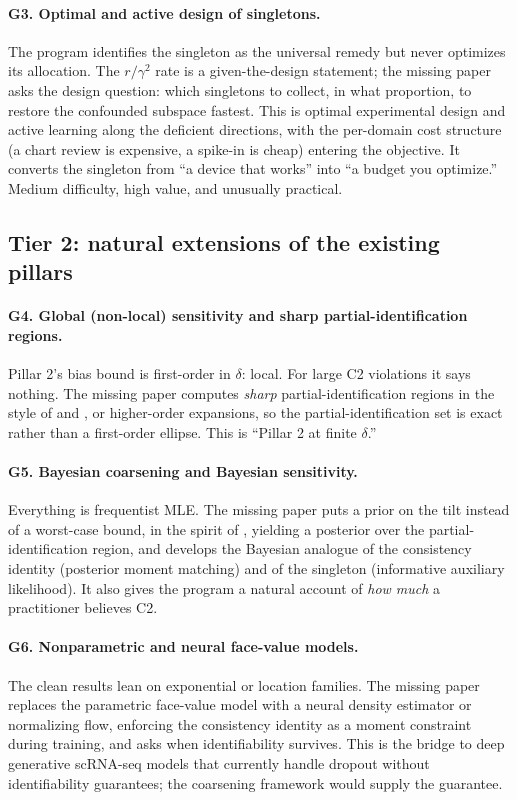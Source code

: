 \documentclass[11pt]{article}
\begin{document}
\paragraph{G3. Optimal and active design of singletons.}
The program identifies the singleton as the universal remedy but never optimizes its
allocation. The $r/\gamma^2$ rate is a given-the-design statement; the missing paper
asks the design question: which singletons to collect, in what proportion, to
restore the confounded subspace fastest. This is optimal experimental design and
active learning along the deficient directions, with the per-domain cost structure
(a chart review is expensive, a spike-in is cheap) entering the objective. It
converts the singleton from ``a device that works'' into ``a budget you optimize.''
Medium difficulty, high value, and unusually practical.

\subsection{Tier 2: natural extensions of the existing pillars}

\paragraph{G4. Global (non-local) sensitivity and sharp partial-identification regions.}
Pillar 2's bias bound is first-order in $\delta$: local. For large C2 violations it
says nothing. The missing paper computes \emph{sharp} partial-identification regions
in the style of \citet{manski1989anatomy} and \citet{tamer2010partial}, or
higher-order expansions, so the partial-identification
set is exact rather than a first-order ellipse. This is ``Pillar 2 at finite
$\delta$.''

\paragraph{G5. Bayesian coarsening and Bayesian sensitivity.}
Everything is frequentist MLE. The missing paper puts a prior on the tilt instead of
a worst-case bound, in the spirit of \citet{daniels2008missing}, yielding a posterior over the
partial-identification region, and develops the Bayesian analogue of the consistency
identity (posterior moment matching) and of the singleton (informative auxiliary
likelihood). It also gives the program a natural account of \emph{how much} a
practitioner believes C2.

\paragraph{G6. Nonparametric and neural face-value models.}
The clean results lean on exponential or location families. The missing paper
replaces the parametric face-value model with a neural density estimator or
normalizing flow, enforcing the consistency identity as a moment constraint during
training, and asks when identifiability survives. This is the bridge to deep
generative scRNA-seq models \citep[scVI, DCA;][]{lopez2018scvi, eraslan2019single}
that currently handle dropout without
identifiability guarantees; the coarsening framework would supply the guarantee.
\end{document}
